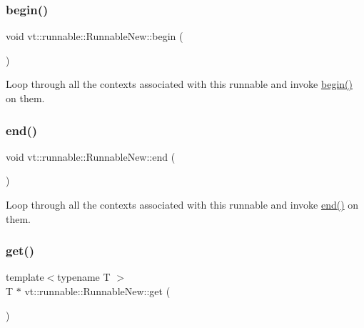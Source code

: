 \subsubsection{\texorpdfstring{begin()}{begin()}}
{\footnotesize\ttfamily void vt\+::runnable\+::\+Runnable\+New\+::begin (\begin{DoxyParamCaption}{ }\end{DoxyParamCaption})\hspace{0.3cm}{\ttfamily [private]}}



Loop through all the contexts associated with this runnable and invoke {\ttfamily \hyperlink{structvt_1_1runnable_1_1_runnable_new_a045c7de03d22865a65dbfac4c51ae1e0}{begin()}} on them. 

\mbox{\label{structvt_1_1runnable_1_1_runnable_new_a068c32bc50b8754909aad6d2464e3cc8}} 
\subsubsection{\texorpdfstring{end()}{end()}}
{\footnotesize\ttfamily void vt\+::runnable\+::\+Runnable\+New\+::end (\begin{DoxyParamCaption}{ }\end{DoxyParamCaption})\hspace{0.3cm}{\ttfamily [private]}}



Loop through all the contexts associated with this runnable and invoke {\ttfamily \hyperlink{structvt_1_1runnable_1_1_runnable_new_a068c32bc50b8754909aad6d2464e3cc8}{end()}} on them. 

\mbox{\label{structvt_1_1runnable_1_1_runnable_new_ab7cbde782a5ad0c67fa4c63f02e174ad}} 
\subsubsection{\texorpdfstring{get()}{get()}}
{\footnotesize\ttfamily template$<$typename T $>$ \\
T $\ast$ vt\+::runnable\+::\+Runnable\+New\+::get (\begin{DoxyParamCaption}{ }\end{DoxyParamCaption})}



